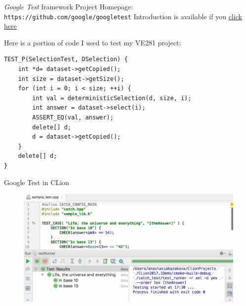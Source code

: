 \begin{frame}[fragile]{\textit{Google Test} framework}
Project Homepage: \texttt{https://github.com/google/googletest}
Introduction is available if you  \hyperlink{https://github.com/google/googletest/blob/master/googletest/docs/Primer.md}{click here}

Here is a portion of code I used to test my VE281 project:
\begin{verbatim}
TEST_P(SelectionTest, DSelection) {
    int *d= dataset->getCopied();
    int size = dataset->getSize();
    for (int i = 0; i < size; ++i) {
        int val = deterministicSelection(d, size, i);
        int answer = dataset->select(i);
        ASSERT_EQ(val, answer);
        delete[] d;
        d = dataset->getCopied();
    }
    delete[] d;
}
\end{verbatim}
\end{frame}

\begin{frame}{Google Test in CLion}
\vspace{-0.3in}

\begin{figure}
	\centering
	\includegraphics[scale=0.25]{fig/rc6gtest}
\end{figure}
\end{frame}

